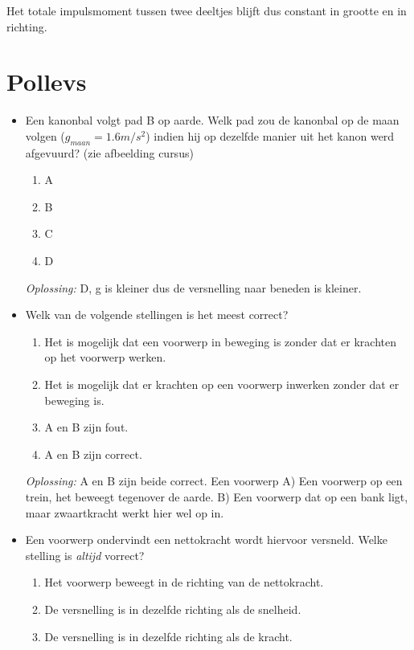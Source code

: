 \documentclass[12pt,a4paper]{article}
\begin{document}
    Het totale impulsmoment tussen twee deeltjes blijft dus constant in grootte en in richting.
    
    
    \section{Pollevs}
    \begin{itemize}
    \renewcommand\labelitemi{--}
    \item Een kanonbal volgt pad B op aarde. Welk pad zou de kanonbal op de maan volgen (\(g_{maan} = 1.6m/s^2\)) indien hij op dezelfde manier uit het kanon werd afgevuurd? (zie afbeelding cursus)
    \begin{enumerate}
    	[label=\alph*)]
    	\item A
    	\item B
    	\item C
    	\item D
    \end{enumerate}
    \textit{Oplossing:} D, g is kleiner dus de versnelling naar beneden is kleiner.
    \newline
    \item Welk van de volgende stellingen is het meest correct?
    \begin{enumerate}[label=\alph*]
    	\item Het is mogelijk dat een voorwerp in beweging is zonder dat er krachten op het voorwerp werken.
    	\item Het is mogelijk dat er krachten op een voorwerp inwerken zonder dat er beweging is.
    	\item A en B zijn fout.
    	\item A en B zijn correct.
    \end{enumerate}
    \textit{Oplossing:} A en B zijn beide correct. Een voorwerp A) Een voorwerp op een trein, het beweegt tegenover de aarde. B) Een voorwerp dat op een bank ligt, maar zwaartkracht werkt hier wel op in.
    \newline
    \item Een voorwerp ondervindt een nettokracht wordt hiervoor versneld. Welke stelling is \textit{altijd} vorrect?
    \begin{enumerate}[label=\alph*]
    	\item Het voorwerp beweegt in de richting van de nettokracht.
    	\item De versnelling is in dezelfde richting als de snelheid.
    	\item De versnelling is in dezelfde richting als de kracht.

\end{enumerate}
\end{itemize}
\end{document}

